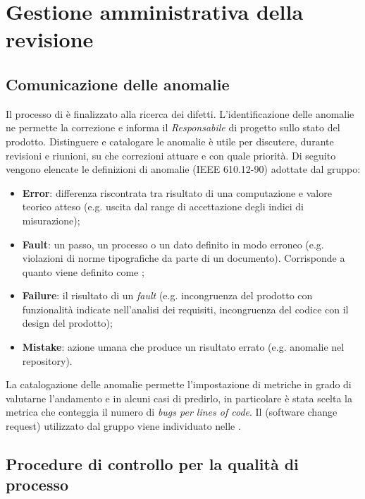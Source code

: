 \section{Gestione amministrativa della revisione}

	\subsection{Comunicazione delle anomalie}
	\label{DefinizioneAnomalie}

	Il processo di  è finalizzato alla ricerca dei difetti. L'identificazione delle anomalie ne permette la correzione e informa il \emph{Responsabile} di progetto sullo stato del prodotto. Distinguere e catalogare le anomalie è utile per discutere, durante revisioni e riunioni, su che correzioni attuare e con quale priorità. Di seguito vengono elencate le definizioni di anomalie (IEEE 610.12-90) adottate dal gruppo:
	\begin{itemize}
		\item \textbf{Error}: differenza riscontrata tra risultato di una computazione e valore teorico atteso (e.g. uscita dal range di accettazione degli indici di misurazione);
		\item \textbf{Fault}: un passo, un processo o un dato definito in modo erroneo (e.g. violazioni di norme tipografiche da parte di un documento). Corrisponde a quanto viene definito come ;
		\item \textbf{Failure}: il risultato di un \emph{fault} (e.g. incongruenza del prodotto con funzionalità indicate nell'analisi dei requisiti, incongruenza del codice con il design del prodotto);
		\item \textbf{Mistake}: azione umana che produce un risultato errato (e.g. anomalie nel repository).
	\end{itemize}
	La catalogazione delle anomalie permette l'impostazione di metriche in grado di valutarne l'andamento e in alcuni casi di predirlo, in particolare è stata scelta la metrica che conteggia il numero di \emph{bugs per lines of code}. Il  (software change request) utilizzato dal gruppo viene individuato nelle \NormeDiProgetto.


	\subsection{Procedure di controllo per la qualità di processo}

